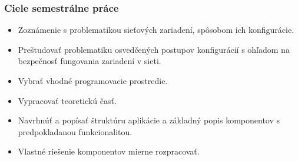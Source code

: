 \documentclass[%
  12pt,       				%
	t,                  %
	aspectratio=1610,   %
	unicode,						%
]{beamer}				    	%
\begin{document}
\vypninavigacnisymboly

\vytvortitulku

\begin{frame} 
	\frametitle{Ciele semestrálne práce}
	\begin{itemize}
			\vspace{1em}
			\item Zoznámenie s problematikou sieťových zariadení, spôsobom ich konfigurácie.\vspace{1em}
			\item Preštudovať problematiku osvedčených postupov konfigurácií s ohľadom na bezpečnosť fungovania zariadení v sieti.\vspace{1em}
			\item Vybrať vhodné programovacie prostredie.\vspace{1em}
			\item Vypracovať teoretickú časť.\vspace{1em}
			\item Navrhnúť a popísať štruktúru aplikácie a základný popis komponentov s predpokladanou funkcionalitou.\vspace{1em}
			\item Vlastné riešenie komponentov mierne rozpracovať.

	\end{itemize}





\end{frame}
\end{document}
